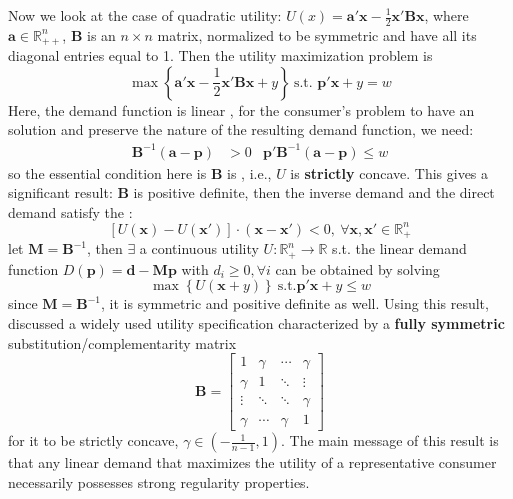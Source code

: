 Now we look at the case of quadratic utility: $U(x)=\mathbf{a}'\mathbf{x}-\frac{1}{2}\mathbf{x}'\mathbf{B}\mathbf{x}$, where $\mathbf{a}\in \mathbb{R}^n_{++}$, $\mathbf{B}$ is an $n\times n$ matrix, normalized to be symmetric and have all its diagonal entries equal to 1. Then the utility maximization problem is
$$
\max \left\{ \mathbf{a}'\mathbf{x}-\frac{1}{2}\mathbf{x}'\mathbf{B}\mathbf{x}+y \right\}\ \text{s.t. }\mathbf{p}'\mathbf{x}+y=w
$$
Here, the demand function is linear , for the consumer's problem to have an  solution and preserve the  nature of the resulting demand function, we need:
\begin{align*}
    \mathbf{B}^{-1}(\mathbf{a}-\mathbf{p})&>0 & \mathbf{p}'\mathbf{B}^{-1}(\mathbf{a}-\mathbf{p})\leq w
\end{align*}
so the essential condition here is $\mathbf{B}$ is , i.e., $U$ is \textbf{strictly} concave. This gives a significant result: $\mathbf{B}$ is positive definite, then the inverse demand and the direct demand satisfy the :
$$
\left[ U(\mathbf{x}) - U(\mathbf{x}') \right]\cdot \left( \mathbf{x}-\mathbf{x}' \right) <0,\ \forall \mathbf{x},\mathbf{x}'\in \mathbb{R}^n_{+}
$$
let $\mathbf{M}=\mathbf{B}^{-1}$, then $\exists$ a continuous utility $U:\mathbb{R}^n_{+}\rightarrow \mathbb{R}$ s.t. the linear demand function $D(\mathbf{p})=\mathbf{d}-\mathbf{Mp}$ with $d_i\geq 0,\forall i$ can be obtained by solving
$$
\max\left\{U(\mathbf{x}+y)\right\}\ \text{s.t.}\mathbf{p'x}+y\leq w
$$
since $\mathbf{M}=\mathbf{B}^{-1}$, it is symmetric and positive definite as well.
Using this result, \citeauthor*{amir2017microeconomic} discussed a widely used utility specification characterized by a \textbf{fully symmetric} substitution/complementarity matrix
$$
\mathbf{B}=\begin{bmatrix}
    1 & \gamma &\cdots &\gamma\\
    \gamma & 1 & \ddots & \vdots\\
    \vdots & \ddots & \ddots & \gamma\\
    \gamma & \cdots & \gamma & 1
\end{bmatrix}
$$
for it to be strictly concave, $\gamma\in \left(-\frac{1}{n-1},1\right)$. 
The main message of this result is that any linear demand that maximizes the utility of a representative consumer necessarily possesses strong regularity properties.

